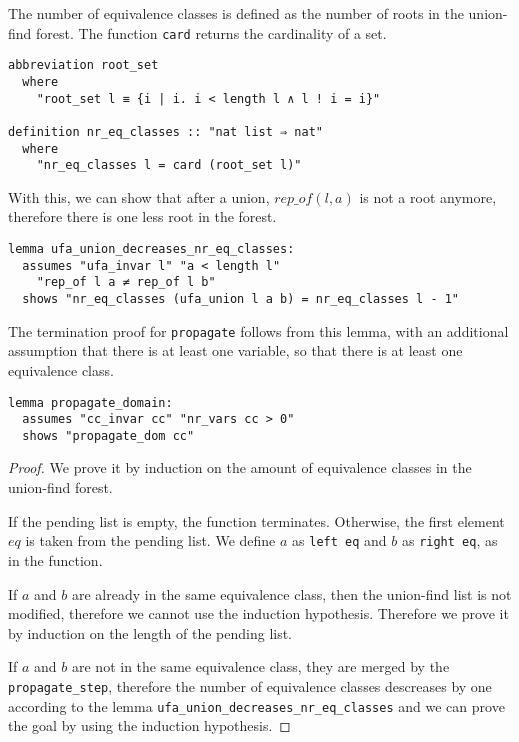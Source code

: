 The number of equivalence classes is defined as the number of roots in the union-find forest. The function \lstinline|card| returns the cardinality of a set.

\begin{lstlisting}
abbreviation root_set
  where
    "root_set l ≡ {i | i. i < length l ∧ l ! i = i}"

definition nr_eq_classes :: "nat list ⇒ nat"
  where
    "nr_eq_classes l = card (root_set l)"
\end{lstlisting}

With this, we can show that after a union, $rep\_of (l, a)$ is not a root anymore, therefore there is one less root in the forest.

\begin{lstlisting}
lemma ufa_union_decreases_nr_eq_classes:
  assumes "ufa_invar l" "a < length l"
    "rep_of l a ≠ rep_of l b"
  shows "nr_eq_classes (ufa_union l a b) = nr_eq_classes l - 1"
\end{lstlisting}

The termination proof for \lstinline{propagate} follows from this lemma, with an additional assumption that there is at least one variable, so that there is at least one equivalence class.

\begin{lstlisting}
lemma propagate_domain:
  assumes "cc_invar cc" "nr_vars cc > 0"
  shows "propagate_dom cc"
\end{lstlisting}

\begin{proof}
We prove it by induction on the amount of equivalence classes in the union-find forest.

If the pending list is empty, the function terminates. Otherwise, the first element $eq$ is taken from the pending list. We define $a$ as \lstinline{left eq} and $b$ as \lstinline{right eq}, as in the function.

If $a$ and $b$ are already in the same equivalence class, then the union-find list is not modified, therefore we cannot use the induction hypothesis. Therefore we prove it by induction on the length of the pending list.

If $a$ and $b$ are not in the same equivalence class, they are merged by the \lstinline{propagate_step}, therefore the number of equivalence classes descreases by one according to the lemma \lstinline{ufa_union_decreases_nr_eq_classes} and we can prove the goal by using the induction hypothesis.
\end{proof}


